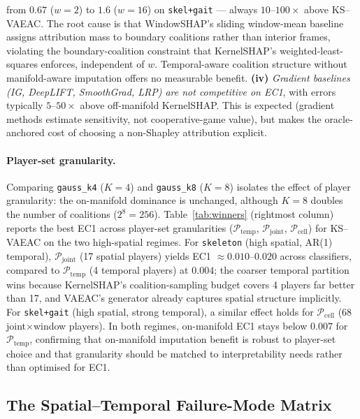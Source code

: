 from $0.67$ ($w{=}2$) to $1.6$ ($w{=}16$) on \texttt{skel+gait} ---
always $10$--$100\times$ above KS--VAEAC.  The root cause is that
WindowSHAP's sliding window-mean baseline assigns attribution mass to
boundary coalitions rather than interior frames, violating the
boundary-coalition constraint that KernelSHAP's weighted-least-squares
enforces, independent of $w$.
Temporal-aware coalition structure without manifold-aware imputation
offers no measurable benefit.
\textbf{(iv)} \emph{Gradient baselines (IG, DeepLIFT, SmoothGrad, LRP) are
not competitive on EC1}, with errors typically $5$--$50\times$ above
off-manifold KernelSHAP.  This is expected (gradient methods estimate
sensitivity, not cooperative-game value), but makes the oracle-anchored
cost of choosing a non-Shapley attribution explicit.

\paragraph{Player-set granularity.}
Comparing \texttt{gauss\_k4} ($K{=}4$) and \texttt{gauss\_k8} ($K{=}8$)
isolates the effect of player granularity: the on-manifold dominance is
unchanged, although $K{=}8$ doubles the number of coalitions ($2^{8}
{=}256$).  Table~\ref{tab:winners} (rightmost column) reports the best
EC1 across player-set granularities
($\mathcal{P}_{\mathrm{temp}}$, $\mathcal{P}_{\mathrm{joint}}$,
$\mathcal{P}_{\mathrm{cell}}$) for KS--VAEAC on the two high-spatial
regimes.  For \texttt{skeleton} (high spatial, AR(1) temporal),
$\mathcal{P}_{\mathrm{joint}}$ (17 spatial players) yields EC1 $\approx
0.010$--$0.020$ across classifiers, compared to $\mathcal{P}_{\mathrm{temp}}$
(4 temporal players) at $0.004$; the coarser temporal partition wins
because KernelSHAP's coalition-sampling budget covers 4 players far
better than 17, and VAEAC's generator already captures spatial structure
implicitly.  For \texttt{skel+gait} (high spatial, strong temporal), a
similar effect holds for $\mathcal{P}_{\mathrm{cell}}$ (68
joint$\times$window players).  In both regimes, on-manifold EC1 stays
below $0.007$ for $\mathcal{P}_{\mathrm{temp}}$, confirming that
on-manifold imputation benefit is robust to player-set choice and that
granularity should be matched to interpretability needs rather than
optimised for EC1.



\subsection{The Spatial--Temporal Failure-Mode Matrix}
\label{sec:results-2x2}

